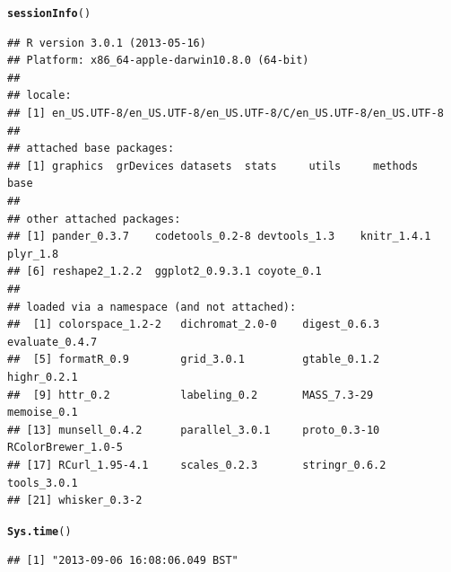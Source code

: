 \documentclass{article}\usepackage[]{graphicx}\usepackage[]{color}
\makeatletter
\newcommand{\hlstd}[1]{\textcolor[rgb]{0.345,0.345,0.345}{#1}}%
\newcommand{\hlkwd}[1]{\textcolor[rgb]{0.737,0.353,0.396}{\textbf{#1}}}%
\newenvironment{kframe}{%
 \def\at@end@of@kframe{}%
 \ifinner\ifhmode%
  \def\at@end@of@kframe{\end{minipage}}%
  \begin{minipage}{\columnwidth}%
 \fi\fi%
 \def\FrameCommand##1{\hskip\@totalleftmargin \hskip-\fboxsep
 \colorbox{shadecolor}{##1}\hskip-\fboxsep
     \hskip-\linewidth \hskip-\@totalleftmargin \hskip\columnwidth}%
 \MakeFramed {\advance\hsize-\width
   \@totalleftmargin\z@ \linewidth\hsize
   \@setminipage}}%
 {\par\unskip\endMakeFramed%
 \at@end@of@kframe}
\newenvironment{knitrout}{}{} %
\makeatother
\begin{document}
\begin{knitrout}
\color{fgcolor}\begin{kframe}
\begin{alltt}
\hlkwd{sessionInfo}\hlstd{()}
\end{alltt}
\begin{verbatim}
## R version 3.0.1 (2013-05-16)
## Platform: x86_64-apple-darwin10.8.0 (64-bit)
## 
## locale:
## [1] en_US.UTF-8/en_US.UTF-8/en_US.UTF-8/C/en_US.UTF-8/en_US.UTF-8
## 
## attached base packages:
## [1] graphics  grDevices datasets  stats     utils     methods   base     
## 
## other attached packages:
## [1] pander_0.3.7    codetools_0.2-8 devtools_1.3    knitr_1.4.1     plyr_1.8       
## [6] reshape2_1.2.2  ggplot2_0.9.3.1 coyote_0.1     
## 
## loaded via a namespace (and not attached):
##  [1] colorspace_1.2-2   dichromat_2.0-0    digest_0.6.3       evaluate_0.4.7    
##  [5] formatR_0.9        grid_3.0.1         gtable_0.1.2       highr_0.2.1       
##  [9] httr_0.2           labeling_0.2       MASS_7.3-29        memoise_0.1       
## [13] munsell_0.4.2      parallel_3.0.1     proto_0.3-10       RColorBrewer_1.0-5
## [17] RCurl_1.95-4.1     scales_0.2.3       stringr_0.6.2      tools_3.0.1       
## [21] whisker_0.3-2
\end{verbatim}
\begin{alltt}
\hlkwd{Sys.time}\hlstd{()}
\end{alltt}
\begin{verbatim}
## [1] "2013-09-06 16:08:06.049 BST"
\end{verbatim}
\end{kframe}
\end{knitrout}
\end{document}
